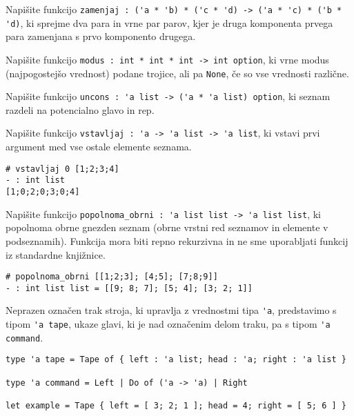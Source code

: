 \documentclass[arhiv]{../izpit}
\begin{document}
	


\naloga

\podnaloga
Napišite funkcijo \verb|zamenjaj : ('a * 'b) * ('c * 'd) -> ('a * 'c) * ('b * 'd)|, ki sprejme dva para in vrne par parov, kjer je druga komponenta prvega para zamenjana s prvo komponento drugega.
  
\podnaloga
 Napišite funkcijo \verb|modus : int * int * int -> int option|, ki vrne modus 
  (najpogostejšo vrednost) podane trojice, ali pa \verb|None|, če so vse vrednosti 
  različne.
  
\podnaloga
 Napišite funkcijo \verb|uncons : 'a list -> ('a * 'a list) option|, ki seznam razdeli
  na potencialno glavo in rep.

\podnaloga
 Napišite funkcijo \verb|vstavljaj : 'a -> 'a list -> 'a list|, ki vstavi prvi 
  argument med vse ostale elemente seznama.

\begin{verbatim}
# vstavljaj 0 [1;2;3;4]
- : int list
[1;0;2;0;3;0;4]
\end{verbatim}

\podnaloga
Napišite funkcijo \verb|popolnoma_obrni : 'a list list -> 'a list list|, ki popolnoma obrne gnezden seznam (obrne vrstni red seznamov in elemente v podseznamih).
Funkcija mora biti repno rekurzivna in ne sme uporabljati funkcij iz standardne knjižnice.

\begin{verbatim}
# popolnoma_obrni [[1;2;3]; [4;5]; [7;8;9]]
- : int list list = [[9; 8; 7]; [5; 4]; [3; 2; 1]]
\end{verbatim}


\naloga

Neprazen označen trak stroja, ki upravlja z vrednostmi tipa \verb|'a|, predstavimo s tipom \verb|'a tape|, ukaze glavi, ki je nad označenim delom traku, pa s tipom \verb|'a command|.

\begin{verbatim}
type 'a tape = Tape of { left : 'a list; head : 'a; right : 'a list }

type 'a command = Left | Do of ('a -> 'a) | Right

let example = Tape { left = [ 3; 2; 1 ]; head = 4; right = [ 5; 6 ] }
\end{verbatim}
\end{document}
